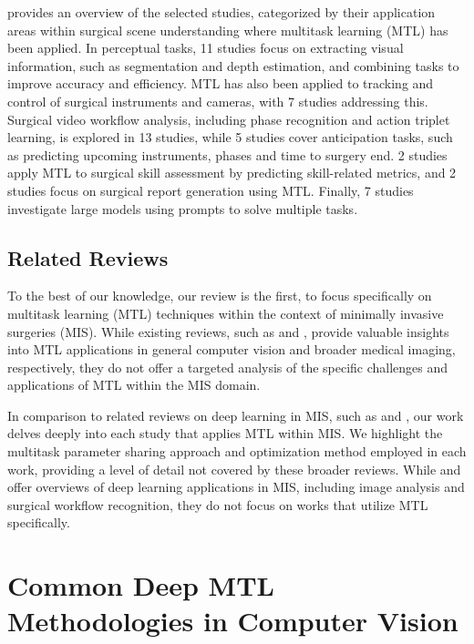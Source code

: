  provides an overview of the selected studies, categorized by their application areas within surgical scene understanding where multitask learning (MTL) has been applied. In perceptual tasks, 11 studies focus on extracting visual information, such as segmentation and depth estimation, and combining tasks to improve accuracy and efficiency. MTL has also been applied to tracking and control of surgical instruments and cameras, with 7 studies addressing this. Surgical video workflow analysis, including phase recognition and action triplet learning, is explored in 13 studies, while 5 studies cover anticipation tasks, such as predicting upcoming instruments, phases and time to surgery end. 2 studies apply MTL to surgical skill assessment by predicting skill-related metrics, and 2 studies focus on surgical report generation using MTL. Finally, 7 studies investigate large models using prompts to solve multiple tasks.

\subsection{Related Reviews}
To the best of our knowledge, our review is the first,  to focus specifically on multitask learning (MTL) techniques within the context of minimally invasive surgeries (MIS).
While existing reviews, such as \citet{survey_simon} and \citet{zhao2023multi}, provide valuable insights into MTL applications in general computer vision and broader medical imaging, respectively, they do not offer a targeted analysis of the specific challenges and applications of MTL within the MIS domain. 

In comparison to related reviews on deep learning in MIS, such as \citet{mis_survey} and \citet{demir2023deep}, our work delves deeply into each study that applies MTL within MIS. We highlight the multitask parameter sharing approach and optimization method employed in each work, providing a level of detail not covered by these broader reviews. While \citet{mis_survey} and \citet{demir2023deep} offer overviews of deep learning applications in MIS, including image analysis and surgical workflow recognition, they do not focus on works that utilize MTL specifically.

\section{Common Deep MTL Methodologies in Computer Vision}\label{sec::multitask_learning_natural_images}


